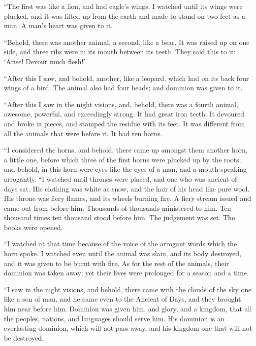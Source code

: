  ``The first was like a lion, and had eagle's wings. I
watched until its wings were plucked, and it was lifted up from the
earth and made to stand on two feet as a man. A man's heart was given to
it.

 ``Behold, there was another animal, a second, like a
bear. It was raised up on one side, and three ribs were in its mouth
between its teeth. They said this to it: `Arise! Devour much flesh!'

 ``After this I saw, and behold, another, like a leopard,
which had on its back four wings of a bird. The animal also had four
heads; and dominion was given to it.

 ``After this I saw in the night visions, and, behold,
there was a fourth animal, awesome, powerful, and exceedingly strong. It
had great iron teeth. It devoured and broke in pieces, and stamped the
residue with its feet. It was different from all the animals that were
before it. It had ten horns.

 ``I considered the horns, and behold, there came up
amongst them another horn, a little one, before which three of the first
horns were plucked up by the roots; and behold, in this horn were eyes
like the eyes of a man, and a mouth speaking arrogantly. 
``I watched until thrones were placed, and one who was ancient of days
sat. His clothing was white as snow, and the hair of his head like pure
wool. His throne was fiery flames, and its wheels burning fire.
 A fiery stream issued and came out from before him.
Thousands of thousands ministered to him. Ten thousand times ten
thousand stood before him. The judgement was set. The books were opened.

 ``I watched at that time because of the voice of the
arrogant words which the horn spoke. I watched even until the animal was
slain, and its body destroyed, and it was given to be burnt with fire.
 As for the rest of the animals, their dominion was taken
away; yet their lives were prolonged for a season and a time.

 ``I saw in the night visions, and behold, there came
with the clouds of the sky one like a son of man, and he came even to
the Ancient of Days, and they brought him near before him.
 Dominion was given him, and glory, and a kingdom, that
all the peoples, nations, and languages should serve him. His dominion
is an everlasting dominion, which will not pass away, and his kingdom
one that will not be destroyed.

